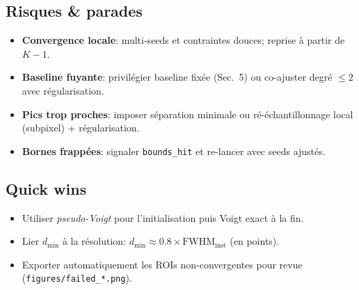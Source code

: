\subsection{Risques \& parades}
\begin{itemize}[nosep]
\item \textbf{Convergence locale}: multi-seeds et contraintes douces; reprise à partir de $K-1$.\
\item \textbf{Baseline fuyante}: privilégier baseline fixée (Sec.~5) ou co-ajuster degré $\le 2$ avec régularisation.\
\item \textbf{Pics trop proches}: imposer séparation minimale ou ré-échantillonnage local (subpixel) + régularisation.\
\item \textbf{Bornes frappées}: signaler \texttt{bounds\_hit} et re-lancer avec seeds ajustés.\
\end{itemize}

\subsection{Quick wins}
\begin{itemize}[nosep]
\item Utiliser \emph{pseudo-Voigt} pour l'initialisation puis Voigt exact à la fin.
\item Lier $d_{\min}$ à la résolution: $d_{\min}\approx 0.8\times \mathrm{FWHM}_{\text{inst}}$ (en points).
\item Exporter automatiquement les ROIs non-convergentes pour revue (\texttt{figures/failed\_*.png}).
\end{itemize}



